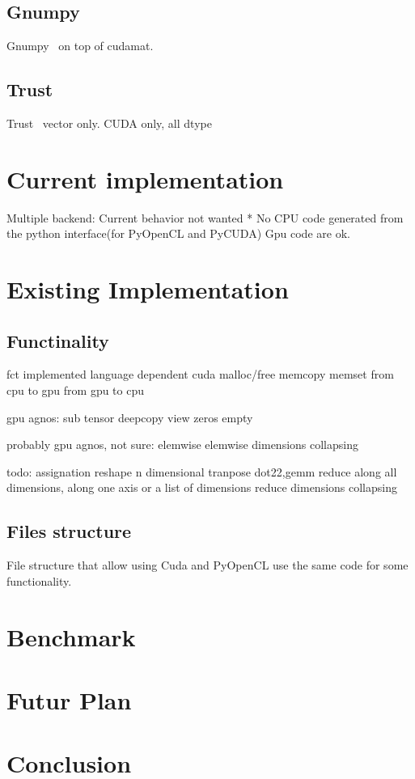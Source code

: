 \documentclass{article} %
\begin{document}
\subsection{Gnumpy}
Gnumpy~\citep{gnumpy-TR2010} on top of cudamat.
\subsection{Trust}
Trust~\citep{Thrust} vector only. CUDA only, all dtype

\section{Current implementation}
Multiple backend:
Current behavior not wanted
    * No CPU code generated from the python interface(for PyOpenCL and PyCUDA) Gpu code are ok.


\section{Existing Implementation}

\subsection{Functinality}


fct implemented language dependent
cuda
malloc/free
memcopy
memset
from cpu to gpu
from gpu to cpu

gpu agnos:
sub tensor
deepcopy
view
zeros
empty

probably gpu agnos, not sure:
elemwise
elemwise dimensions collapsing


todo:
assignation
reshape
n dimensional tranpose
dot22,gemm
reduce along all dimensions, along one axis or a list of dimensions
reduce dimensions collapsing

\subsection{Files structure}
File structure that allow using Cuda and PyOpenCL use the same code for some functionality.

\section{Benchmark}
\section{Futur Plan}
\section{Conclusion}
\end{document}
